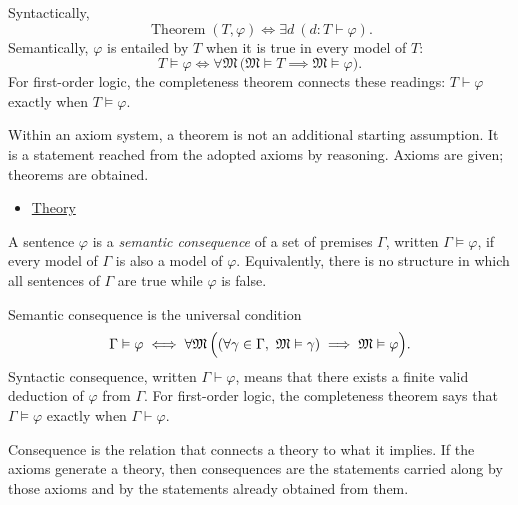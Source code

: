\begin{remark*}
Syntactically,
\[
  \operatorname{Theorem}(T,\varphi)
  \iff \exists d\ (d:T\vdash\varphi).
\]
Semantically, $\varphi$ is entailed by $T$ when it is true in every model of
$T$:
\[
  T\vDash\varphi
  \iff
  \forall\mathfrak{M}\,
  \bigl(\mathfrak{M}\vDash T \implies \mathfrak{M}\vDash\varphi\bigr).
\]
For first-order logic, the completeness theorem connects these readings:
$T\vdash\varphi$ exactly when $T\vDash\varphi$.
\end{remark*}

\begin{remark*}[Interpretation]
Within an axiom system, a theorem is not an additional starting assumption. It
is a statement reached from the adopted axioms by reasoning. Axioms are given;
theorems are obtained.
\end{remark*}

\begin{dependencies}
\begin{itemize}
  \item \hyperref[def:axiom-systems-theory]{Theory}
\end{itemize}
\end{dependencies}

\begin{definition}[Consequence]
\label{def:axiom-systems-consequence}
A sentence $\varphi$ is a \emph{semantic consequence} of a set of premises
$\Gamma$, written $\Gamma\vDash\varphi$, if every model of $\Gamma$ is also a
model of $\varphi$. Equivalently, there is no structure in which all sentences
of $\Gamma$ are true while $\varphi$ is false.
\end{definition}

\begin{remark*}
Semantic consequence is the universal condition
\[
  \Gamma\vDash\varphi
  \iff
  \forall\mathfrak{M}\,
  \Bigl(
    (\forall\gamma\in\Gamma,\ \mathfrak{M}\vDash\gamma)
    \implies
    \mathfrak{M}\vDash\varphi
  \Bigr).
\]
Syntactic consequence, written $\Gamma\vdash\varphi$, means that there exists
a finite valid deduction of $\varphi$ from $\Gamma$. For first-order logic,
the completeness theorem says that $\Gamma\vDash\varphi$ exactly when
$\Gamma\vdash\varphi$.
\end{remark*}

\begin{remark*}[Interpretation]
Consequence is the relation that connects a theory to what it implies. If the
axioms generate a theory, then consequences are the statements carried along
by those axioms and by the statements already obtained from them.
\end{remark*}

